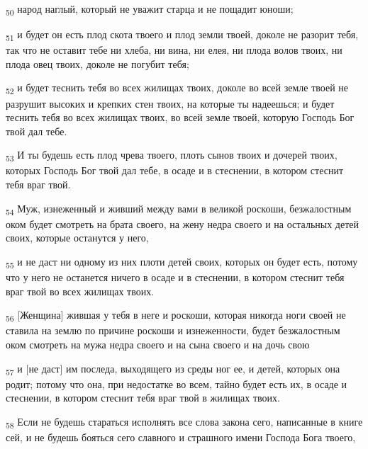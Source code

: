 \begin{tcolorbox}
\textsubscript{50} народ наглый, который не уважит старца и не пощадит юноши;
\end{tcolorbox}
\begin{tcolorbox}
\textsubscript{51} и будет он есть плод скота твоего и плод земли твоей, доколе не разорит тебя, так что не оставит тебе ни хлеба, ни вина, ни елея, ни плода волов твоих, ни плода овец твоих, доколе не погубит тебя;
\end{tcolorbox}
\begin{tcolorbox}
\textsubscript{52} и будет теснить тебя во всех жилищах твоих, доколе во всей земле твоей не разрушит высоких и крепких стен твоих, на которые ты надеешься; и будет теснить тебя во всех жилищах твоих, во всей земле твоей, которую Господь Бог твой дал тебе.
\end{tcolorbox}
\begin{tcolorbox}
\textsubscript{53} И ты будешь есть плод чрева твоего, плоть сынов твоих и дочерей твоих, которых Господь Бог твой дал тебе, в осаде и в стеснении, в котором стеснит тебя враг твой.
\end{tcolorbox}
\begin{tcolorbox}
\textsubscript{54} Муж, изнеженный и живший между вами в великой роскоши, безжалостным оком будет смотреть на брата своего, на жену недра своего и на остальных детей своих, которые останутся у него,
\end{tcolorbox}
\begin{tcolorbox}
\textsubscript{55} и не даст ни одному из них плоти детей своих, которых он будет есть, потому что у него не останется ничего в осаде и в стеснении, в котором стеснит тебя враг твой во всех жилищах твоих.
\end{tcolorbox}
\begin{tcolorbox}
\textsubscript{56} [Женщина] жившая у тебя в неге и роскоши, которая никогда ноги своей не ставила на землю по причине роскоши и изнеженности, будет безжалостным оком смотреть на мужа недра своего и на сына своего и на дочь свою
\end{tcolorbox}
\begin{tcolorbox}
\textsubscript{57} и [не даст] им последа, выходящего из среды ног ее, и детей, которых она родит; потому что она, при недостатке во всем, тайно будет есть их, в осаде и стеснении, в котором стеснит тебя враг твой в жилищах твоих.
\end{tcolorbox}
\begin{tcolorbox}
\textsubscript{58} Если не будешь стараться исполнять все слова закона сего, написанные в книге сей, и не будешь бояться сего славного и страшного имени Господа Бога твоего,
\end{tcolorbox}
